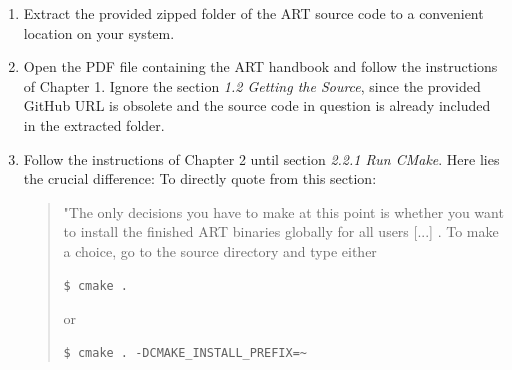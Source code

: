 \begin{enumerate}
	
	\item Extract the provided zipped folder of the ART source code to a convenient location on your system.
	
	\item Open the PDF file containing the ART handbook and follow the instructions of Chapter 1. Ignore the section \emph{1.2 Getting the Source}, since the provided GitHub URL is obsolete and the source code in question is already included in the extracted folder.
	
	\item Follow the instructions of Chapter 2 until section \emph{2.2.1 Run CMake}. Here lies the crucial difference:
	To directly quote from this section:
	\begin{quote}
		"The  only  decisions  you  have  to  make  at  this  point  is  whether  you  want  to  install  the  finished  ART binaries globally for all users [...] . To make a choice, go to the source directory and type either
\begin{Verbatim}
$ cmake .
\end{Verbatim}
		or
\begin{Verbatim}
$ cmake . -DCMAKE_INSTALL_PREFIX=~
\end{Verbatim}
	\end{quote}
	

\end{enumerate}
